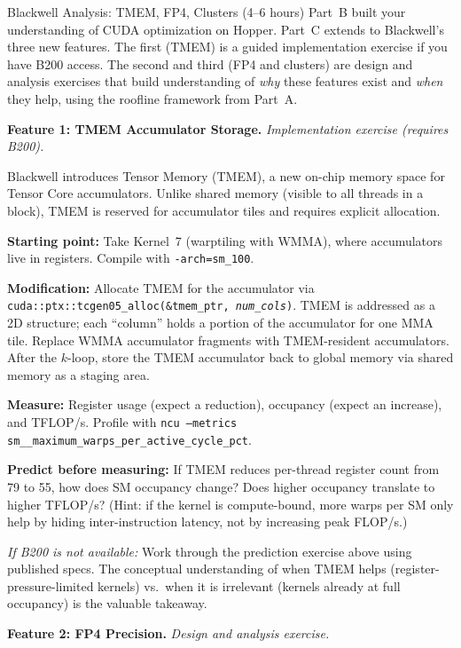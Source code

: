 \begin{exercise}{Blackwell Analysis: TMEM, FP4, Clusters (4--6 hours)}
Part~B built your understanding of CUDA optimization on Hopper. Part~C extends to Blackwell's three new features. The first (TMEM) is a guided implementation exercise if you have B200 access. The second and third (FP4 and clusters) are design and analysis exercises that build understanding of \textit{why} these features exist and \textit{when} they help, using the roofline framework from Part~A.

\medskip
\textbf{Feature 1: TMEM Accumulator Storage.} \textit{Implementation exercise (requires B200).}

Blackwell introduces Tensor Memory (TMEM), a new on-chip memory space for Tensor Core accumulators. Unlike shared memory (visible to all threads in a block), TMEM is reserved for accumulator tiles and requires explicit allocation.

\textbf{Starting point:} Take Kernel~7 (warptiling with WMMA), where accumulators live in registers. Compile with \texttt{-arch=sm\_100}.

\textbf{Modification:} Allocate TMEM for the accumulator via \texttt{cuda::ptx::tcgen05\_alloc(\&tmem\_ptr, \textit{num\_cols})}. TMEM is addressed as a 2D structure; each ``column'' holds a portion of the accumulator for one MMA tile. Replace WMMA accumulator fragments with TMEM-resident accumulators. After the $k$-loop, store the TMEM accumulator back to global memory via shared memory as a staging area.

\textbf{Measure:} Register usage (expect a reduction), occupancy (expect an increase), and TFLOP/s. Profile with \texttt{ncu --metrics sm\_\_maximum\_warps\_per\_active\_cycle\_pct}.

\textbf{Predict before measuring:} If TMEM reduces per-thread register count from 79 to 55, how does SM occupancy change? Does higher occupancy translate to higher TFLOP/s? (Hint: if the kernel is compute-bound, more warps per SM only help by hiding inter-instruction latency, not by increasing peak FLOP/s.)

\textit{If B200 is not available:} Work through the prediction exercise above using published specs. The conceptual understanding of when TMEM helps (register-pressure-limited kernels) vs.\ when it is irrelevant (kernels already at full occupancy) is the valuable takeaway.

\medskip
\textbf{Feature 2: FP4 Precision.} \textit{Design and analysis exercise.}


\end{exercise}
